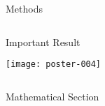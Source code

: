 \documentclass[final]{beamer}
\newlength{\onecolwid}
\newlength{\twocolwid}
\begin{document}
\begin{frame}[t]
\begin{columns}[t]
\begin{column}{\twocolwid}
\begin{columns}[t,totalwidth=\twocolwid]
\begin{column}{\onecolwid}
\begin{block}{Methods}
\end{block}


\end{column} %

\end{columns} %


\begin{alertblock}{Important Result}

\texttt{[image: poster-004]}
\end{alertblock} 


\begin{columns}[t,totalwidth=\twocolwid] %

\begin{column}{\onecolwid} %


\begin{block}{Mathematical Section}


\end{block}
\end{column}
\end{columns}
\end{column}
\end{columns}
\end{frame}
\end{document}
